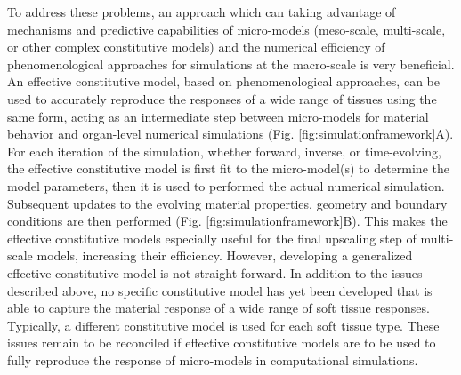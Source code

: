     To address these problems, an approach which can taking advantage of mechanisms and predictive capabilities of micro-models (meso-scale, multi-scale, or other complex constitutive models) and the numerical efficiency of phenomenological approaches for simulations at the macro-scale is very beneficial. An effective constitutive model, based on phenomenological approaches, can be used to accurately reproduce the responses of a wide range of tissues using the same form, acting as an intermediate step between micro-models for material behavior and organ-level numerical simulations (Fig. \ref{fig:simulationframework}A). For each iteration of the simulation, whether forward, inverse, or time-evolving, the effective constitutive model is first fit to the micro-model(s) to determine the model parameters, then it is used to performed the actual numerical simulation. Subsequent updates to the evolving material properties, geometry and boundary conditions are then performed (Fig. \ref{fig:simulationframework}B). This makes the effective constitutive models especially useful for the final upscaling step of multi-scale models, increasing their efficiency. However, developing a generalized effective constitutive model is not straight forward. In addition to the issues described above, no specific constitutive model has yet been developed that is able to capture the material response of a wide range of soft tissue responses. Typically, a different constitutive model is used for each soft tissue type. These issues remain to be reconciled if effective constitutive models are to be used to fully reproduce the response of micro-models in computational simulations. 
    
